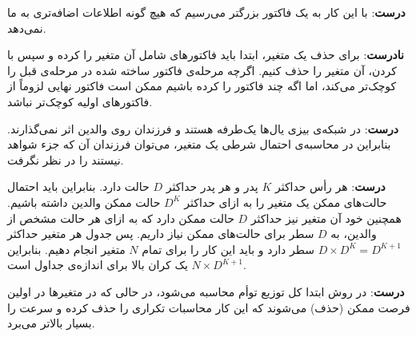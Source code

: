 \begin{ابجد}
\item \textbf{درست}: با این کار به یک فاکتور بزرگتر می‌رسیم که هیچ گونه اطلاعات اضافه‌تری به ما نمی‌دهد.

\item \textbf{نادرست}: برای حذف یک متغیر، ابتدا باید فاکتورهای شامل آن متغیر را  کرده و سپس با  کردن، آن متغیر را حذف کنیم. اگرچه مرحله‌ی  فاکتور ساخته شده در مرحله‌ی قبل را کوچک‌تر می‌کند، اما اگه چند فاکتور را  کرده باشیم ممکن است فاکتور نهایی لزوماً از فاکتورهای اولیه کوچک‌تر نباشد.

\item \textbf{درست}: در شبکه‌ی بیزی یال‌ها یک‌طرفه هستند و فرزندان روی والدین اثر نمی‌گذارند. بنابراین در محاسبه‌ی احتمال شرطی یک متغیر، می‌توان فرزندان آن که جزء شواهد نیستند را در نظر نگرفت.

\item \textbf{درست}: هر رأس حداکثر $K$ پدر و هر پدر حداکثر $D$ حالت دارد. بنابراین باید احتمال حالت‌های ممکن یک متغیر را به ازای حداکثر $D^K$ حالت ممکن والدین داشته باشیم. همچنین خود آن متغیر نیز حداکثر $D$ حالت ممکن دارد که به ازای هر حالت مشخص از والدین، به $D$ سطر برای حالت‌های ممکن نیاز داریم. پس جدول هر متغیر حداکثر $D \times D^K = D^{K+1}$ سطر دارد و باید این کار را برای تمام $N$ متغیر انجام دهیم. بنابراین $N \times D^{K+1}$ یک کران بالا برای اندازه‌ی جداول است.

\item \textbf{درست}: در روش  ابتدا کل توزیع توأم محاسبه می‌شود، در حالی که در  متغیرها در اولین فرصت ممکن  (حذف) می‌شوند که این کار محاسبات تکراری را حذف کرده و سرعت را بسیار بالاتر می‌برد.

\end{ابجد}